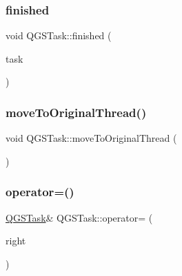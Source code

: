 \subsubsection{\texorpdfstring{finished}{finished}}
{\footnotesize\ttfamily void Q\+G\+S\+Task\+::finished (\begin{DoxyParamCaption}\item[{\mbox{\hyperlink{class_q_g_s_task}{Q\+G\+S\+Task}} $\ast$}]{task }\end{DoxyParamCaption})\hspace{0.3cm}{\ttfamily [signal]}}

\mbox{\label{class_q_g_s_task_a42cb553217cbf0a1245d05fece653e71}} 
\subsubsection{\texorpdfstring{move\+To\+Original\+Thread()}{moveToOriginalThread()}}
{\footnotesize\ttfamily void Q\+G\+S\+Task\+::move\+To\+Original\+Thread (\begin{DoxyParamCaption}{ }\end{DoxyParamCaption})}

\mbox{\label{class_q_g_s_task_a0ee95d2815f3dd2688bb8cbe33ee3bba}} 
\subsubsection{\texorpdfstring{operator=()}{operator=()}\hspace{0.1cm}{\footnotesize\ttfamily [1/2]}}
{\footnotesize\ttfamily \mbox{\hyperlink{class_q_g_s_task}{Q\+G\+S\+Task}}\& Q\+G\+S\+Task\+::operator= (\begin{DoxyParamCaption}\item[{const \mbox{\hyperlink{class_q_g_s_task}{Q\+G\+S\+Task}} \&}]{right }\end{DoxyParamCaption})\hspace{0.3cm}{\ttfamily [delete]}}

\mbox{\label{class_q_g_s_task_a63666786f1c09a76f511c4df86cd1d2a}} 
